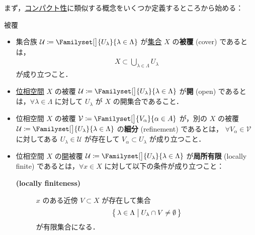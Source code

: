 \documentclass[geometry_main]{subfiles}
\begin{document}
まず，\hyperref[def.compact]{コンパクト性}に類似する概念をいくつか定義するところから始める：
\begin{mydef}[label=def:cover, breakable]{被覆}
    \begin{itemize}
        \item 集合族 $\mathcal{U} \coloneqq \Familyset[\big]{U_\lambda}{\lambda \in \Lambda}$ が\underline{集合} $X$ の\textbf{被覆} (cover) であるとは，
        \begin{align}
            X \subset \bigcup_{\lambda \in \Lambda} U_\lambda
        \end{align}
        が成り立つこと．
        \item \underline{位相空間} $X$ の被覆 $\mathcal{U} \coloneqq \Familyset[\big]{U_\lambda}{\lambda \in \Lambda}$ が\textbf{開} (open) であるとは，$\forall \lambda \in \Lambda$ に対して $U_\lambda$ が $X$ の開集合であること．
        \item 位相空間 $X$ の被覆 $\mathcal{V} \coloneqq \Familyset[\big]{V_\alpha}{\alpha \in A}$ が，別の $X$ の被覆 $\mathcal{U} \coloneqq \Familyset[\big]{U_\lambda}{\lambda \in \Lambda}$ の\textbf{細分} (refinement) であるとは，
        $\forall V_\alpha \in \mathcal{V}$ に対してある $U_\lambda \in \mathcal{U}$ が存在して $V_\alpha \subset U_\lambda$ が成り立つこと．
        \item 位相空間 $X$ の\underline{開}被覆 $\mathcal{U} \coloneqq \Familyset[\big]{U_\lambda}{\lambda \in \Lambda}$ が\textbf{局所有限} (locally finite) であるとは，$\forall x \in X$ に対して以下の条件が成り立つこと：
        \begin{description}
            \item[\textbf{(locally finiteness)}] $x$ のある近傍 $V \subset X$ が存在して集合
            \begin{align}
                \bigl\{\, \lambda \in \Lambda \bigm| U_\lambda \cap V \neq \emptyset \,\bigr\} 
            \end{align}
            が有限集合になる．
        \end{description}
    \end{itemize}
\end{mydef}
\end{document}
